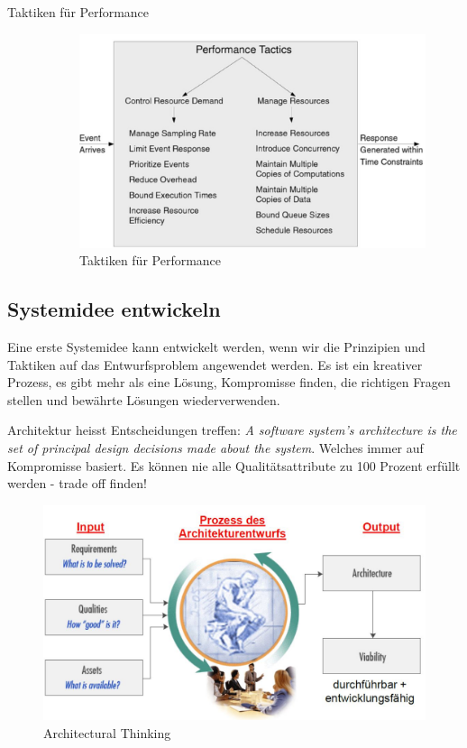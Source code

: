 \begin{description}
	\item[Taktiken für Performance]
	\begin{figure}[h!]
	\centering
	\includegraphics[width=0.7\linewidth]{fig/tactic-performance}
	\caption{Taktiken für Performance}
	\label{fig:tactic-performance}
	\end{figure}
	
\end{description}

\subsection{Systemidee entwickeln}
Eine erste Systemidee kann entwickelt werden, wenn wir die Prinzipien und Taktiken auf das Entwurfsproblem angewendet werden. Es ist ein kreativer Prozess, es gibt mehr als eine Lösung, Kompromisse finden, die richtigen Fragen stellen und bewährte Lösungen wiederverwenden.

Architektur heisst Entscheidungen treffen: \emph{A software system's architecture is the set of principal design decisions made about the system}. Welches immer auf Kompromisse basiert. Es können nie alle Qualitätsattribute zu 100 Prozent erfüllt werden - trade off finden!

\begin{figure}[h!]
\centering
\includegraphics[width=0.7\linewidth]{fig/architectural-thinking}
\caption{Architectural Thinking}
\label{fig:architectural-thinking}
\end{figure}

